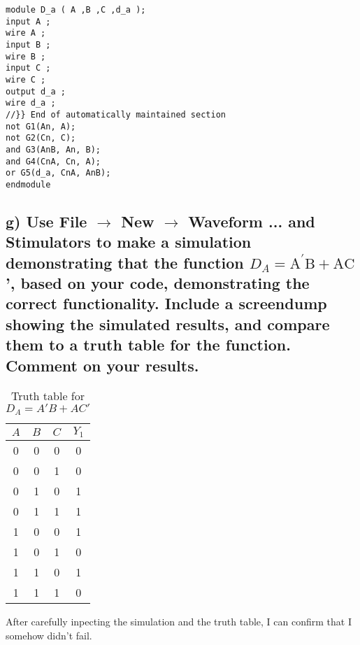 \begin{lstlisting}
module D_a ( A ,B ,C ,d_a );
input A ;
wire A ;
input B ;
wire B ;
input C ;
wire C ;
output d_a ;
wire d_a ;
//}} End of automatically maintained section
not G1(An, A);
not G2(Cn, C);
and G3(AnB, An, B);
and G4(CnA, Cn, A);
or G5(d_a, CnA, AnB);
endmodule
\end{lstlisting}
\pagebreak
\subsection*{g) Use File $\rightarrow$ New $\rightarrow$ Waveform ... and Stimulators to make a simulation demonstrating that the function $D_A=\mathrm{A}^{\prime} \mathrm{B}+\mathrm{AC}$ ', based on your code, demonstrating the correct functionality. Include a screendump showing the simulated results, and compare them to a truth table for the function. Comment on your results.}

\begin{table}[H]
    \centering
    \caption{Truth table for \( D_A = A' B + A C' \)}
    \label{tab:truth_table_DA1}
    \begin{tabular}{|c|c|c|c|}
    \hline
    \( A \) & \( B \) & \( C \) & \( Y_1 \) \\
    \hline
    0 & 0 & 0 & 0 \\
    0 & 0 & 1 & 0 \\
    0 & 1 & 0 & 1 \\
    0 & 1 & 1 & 1 \\
    1 & 0 & 0 & 1 \\
    1 & 0 & 1 & 0 \\
    1 & 1 & 0 & 1 \\
    1 & 1 & 1 & 0 \\
    \hline
    \end{tabular}
\end{table}

After carefully inpecting the simulation and the truth table, I can confirm that I somehow didn't fail.



